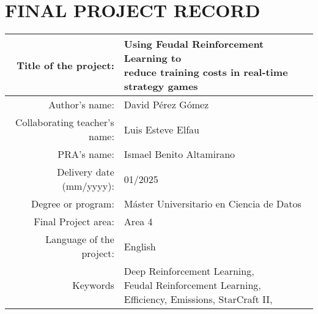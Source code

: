 \chapter*{FINAL PROJECT RECORD}

\begin{table}[ht]
\centering{}
\renewcommand{\arraystretch}{2}
\begin{tabular}{r | l}
\hline
Title of the project: & \makecell[cl]{Using Feudal Reinforcement Learning to\\reduce training costs in real-time strategy games}\\
\hline
Author's name: & David Pérez Gómez\\
\hline
Collaborating teacher's name: & Luis Esteve Elfau\\
\hline
PRA's name: & Ismael Benito Altamirano\\
\hline
Delivery date (mm/yyyy): & 01/2025\\
\hline
Degree or program: & Máster Universitario en Ciencia de Datos\\
\hline
Final Project area: & Area 4\\
\hline
Language of the project: & English\\
\hline
Keywords & \makecell[cl]{Deep Reinforcement Learning,\\ Feudal Reinforcement Learning,\\ Efficiency, Emissions, StarCraft II,\\}\\
\hline
\end{tabular}
\end{table}